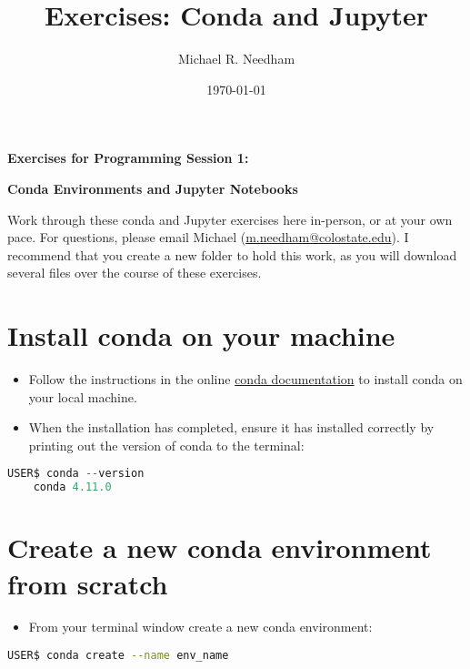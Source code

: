 \documentclass[10pt]{article}
\title{Exercises: Conda and Jupyter}
\author{Michael R. Needham}
\date{\today}
\begin{document}
	
	\lhead{\theauthor}
	\rhead{\thetitle}
	
	\begin{center}
		\textbf{\LARGE Exercises for Programming Session 1: }
		
		\textbf{\LARGE Conda Environments and Jupyter Notebooks}		
	\end{center}

	
	\noindent
	Work through these conda and Jupyter exercises here in-person, or at your own pace. For questions, please email Michael (\href{mailto:m.needham@colostate.edu}{m.needham@colostate.edu}). I recommend that you create a new folder to hold this work, as you will download several files over the course of these exercises.
		\section{Install conda on your machine}

\begin{itemize}
\item Follow the instructions in the online \href{https://conda.io/projects/conda/en/latest/user-guide/install/index.html}{conda documentation} to install conda on your local machine.
\item When the installation has completed, ensure it has installed correctly by printing out the version of conda to the terminal:
\end{itemize}		

		
\begin{lstlisting}[language=Python]
	USER$ conda --version
	conda 4.11.0
\end{lstlisting}
	

\section{Create a new conda environment from scratch}
\begin{itemize}
	\item From your terminal window create a new conda environment:
\end{itemize}
\begin{lstlisting}[language=bash]
	USER$ conda create --name env_name
\end{lstlisting}
\end{document}
